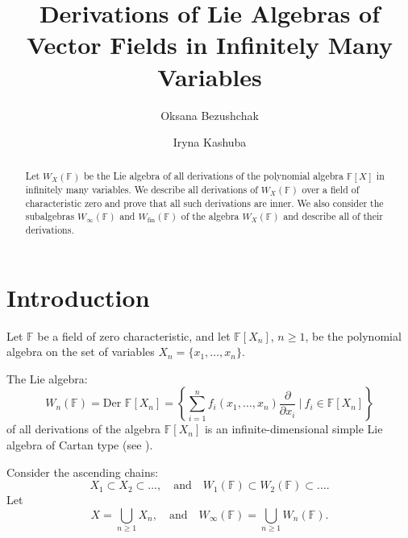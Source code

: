 \documentclass[12pt,a4paper]{amsart}
\theoremstyle{plain}
\begin{document}
	
	\title{Derivations of Lie Algebras of Vector Fields in Infinitely Many Variables}
	
	
		\author
	{Oksana Bezushchak}
	\address{Oksana Bezushchak: Faculty of Mechanics and Mathematics, Taras Shevchenko National University of Kyiv, Volodymyrska, 60, Kyiv 01033, Ukraine}
	
	\author{Iryna Kashuba}
	\address{Iryna Kashuba: Shenzhen International Center for Mathematics, Southern University of Science and Technology, 1088 Xueyuan Avenue, Nanshan District, Shenzhen, Guangdong, China}
	
	\maketitle
	
		\begin{abstract}
	Let $W_X(\mathbb{F})$ be the Lie algebra of all derivations of the polynomial algebra $\mathbb{F}[X]$ in infinitely many variables.	We describe  all derivations of $W_X(\mathbb{F})$  over a field of  characteristic zero and  prove that all  such derivations are inner. We also consider   the subalgebras $W_\infty(\mathbb{F})$  and $W_{\text{fin}}(\mathbb{F})$ of the algebra $W_X(\mathbb{F})$ and describe  all of their derivations. 	
	\end{abstract}
	
	
	\section{Introduction} 
	
	Let $\mathbb{F}$ be a field of zero characteristic, and let $\mathbb{F}[X_n]$, $n \geq 1$, be the polynomial algebra on the set of variables $X_n = \{x_1, \dots, x_n\}$.
	
	The Lie algebra:
	\[
	W_n(\mathbb{F}) = \text{Der } \mathbb{F}[X_n] = \left\{ \sum_{i=1}^{n} f_i(x_1, \dots, x_n) \frac{\partial}{\partial x_i} \ \Big| \ f_i \in \mathbb{F}[X_n] \right\}
	\]
	of all derivations of the algebra $\mathbb{F}[X_n]$ is an infinite-dimensional simple Lie algebra of Cartan type (see \cite{Rudakov1,Strade}).
	
	Consider the ascending chains: \[
	X_1 \subset X_2 \subset \dots, \quad \text{and} \quad 
	W_1(\mathbb{F}) \subset W_2(\mathbb{F}) \subset \dots .
	\]
	Let $$X = \bigcup_{n \geq 1} X_n ,\quad \text{and} \quad  W_\infty(\mathbb{F}) = \bigcup_{n \geq 1} W_n(\mathbb{F}).$$ 
	
\end{document}
